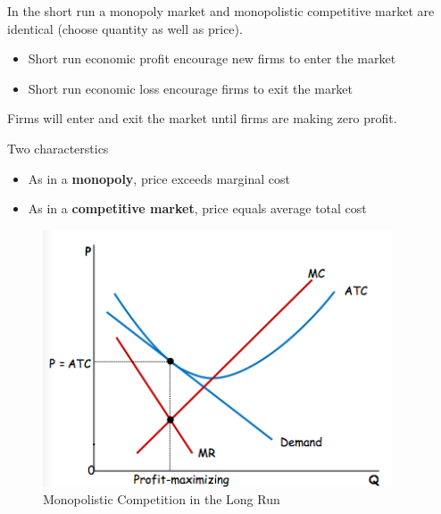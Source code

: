 \documentclass[a4paper,titlepage] {scrartcl}
\begin{document}
In the short run a monopoly market and monopolistic competitive market are identical (choose quantity as well as price).

\begin{itemize}
	\item Short run economic profit encourage new firms to enter the market
	\item Short run economic loss encourage firms to exit the market
\end{itemize}

Firms will enter and exit the market until firms are making zero profit.

Two characterstics
\begin{itemize}
	\item As in a \textbf{monopoly}, price exceeds marginal cost
	\item As in a \textbf{competitive market}, price equals average total cost
\end{itemize}
\begin{figure}[htbp]
	\centering
		\includegraphics[height=3in]{images/lrmonocom.png}
	\caption{Monopolistic Competition in the Long Run}
	\label{fig:images_lrmonocom}
\end{figure}



\end{document}
